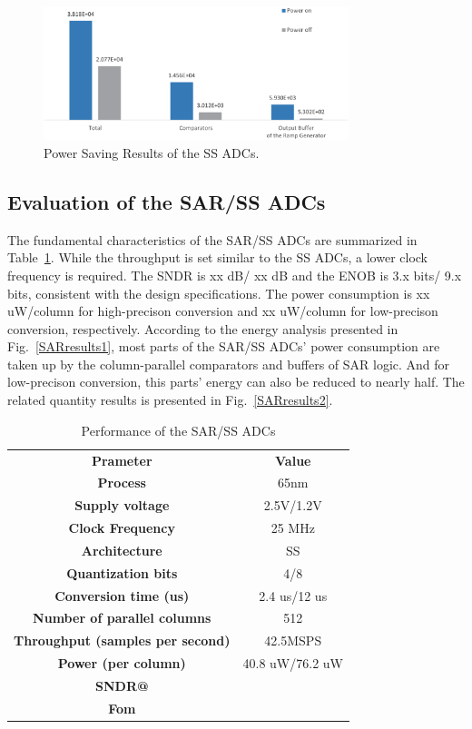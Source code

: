 \documentclass[conference]{IEEEtran}
\begin{document}
\begin{figure}[htbp]
	\centerline{\includegraphics[width=3.5in]{./Figures/SSResults2.eps}}
	\caption{Power Saving Results of the SS ADCs.}
	\label{SSresults2}
\end{figure} 

\subsection{Evaluation of the SAR/SS ADCs}
The fundamental characteristics of the SAR/SS ADCs are summarized in Table~\ref{tab2}. While the throughput is set similar to the SS ADCs, a lower clock frequency is required. The SNDR is xx dB/ xx dB and the ENOB is 3.x bits/ 9.x bits, consistent with the design specifications. The power consumption is xx uW/column for high-precison conversion and xx uW/column for low-precison conversion, respectively. According to the energy analysis presented in Fig.~\ref{SARresults1}, most parts of the SAR/SS ADCs' power consumption are taken up by the column-parallel comparators and buffers of SAR logic. And for low-precison conversion, this parts' energy can also be reduced to nearly half. The related quantity results is presented in Fig.~\ref{SARresults2}.
\begin{table}[htbp]
	\caption{Performance of the SAR/SS ADCs}
	\begin{center}
		\begin{tabular}{|c|c|}
			\hline
			\textbf{Prameter}& \textbf{Value} \\
			\hhline{|==|}
			\textbf{Process}& 65nm \\
			\hline 
			\textbf{Supply voltage}& 2.5V/1.2V \\
			\hline
			\textbf{Clock Frequency}&	25 MHz \\
			\hline
			\textbf{Architecture}&	SS \\
			\hline
			\textbf{Quantization bits}&	4/8 \\
			\hline
			\textbf{Conversion time (us)}&	2.4 us/12 us \\
			\hline
			\textbf{Number of parallel columns}&	512 \\
			\hline
			\textbf{Throughput (samples per second)}&	42.5MSPS \\ 
			\hline
			\textbf{Power (per column)}&	40.8 uW/76.2 uW \\
			\hline
			\textbf{SNDR@}& \\
			\hline
			\textbf{Fom}& \\
			\hline	    
		\end{tabular}
		\label{tab2}
	\end{center}
\end{table}
\end{document}
